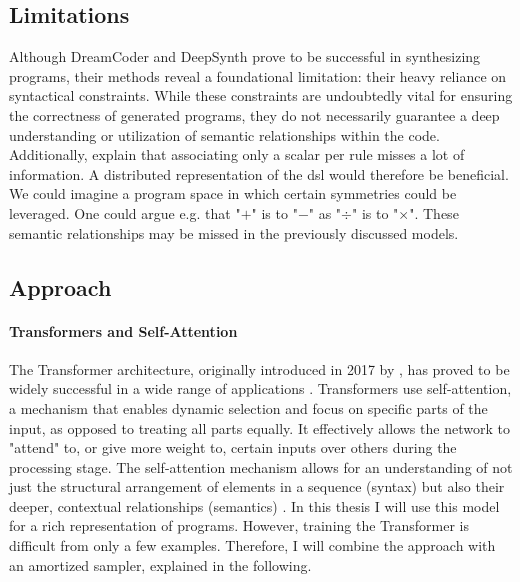 \subsection{Limitations}
Although DreamCoder and DeepSynth prove to be successful in synthesizing programs, their methods reveal a foundational limitation: their heavy reliance on syntactical constraints.
While these constraints are undoubtedly vital for ensuring the correctness of generated programs, they do not necessarily guarantee a deep understanding or utilization of semantic relationships within the code. Additionally, \citet{kimCompoundProbabilisticContextFree2019} explain that associating only a scalar per rule misses a lot of information. A distributed representation of the \acrshort{dsl} would therefore be beneficial. We could imagine a program space in which certain symmetries could be leveraged. One could argue e.g. that "\(+\)" is to "\(-\)" as "\(\div\)" is to "\(\times\)". These semantic relationships may be missed in the previously discussed models.

\subsection{Approach}
\paragraph*{Transformers and Self-Attention}
The Transformer architecture, originally introduced in 2017 by \citet{vaswaniAttentionAllYou2017}, has proved to be widely successful in a wide range of applications \cite{wolfTransformersStateoftheArtNatural2020,khanTransformersVisionSurvey2022}. Transformers use self-attention, a mechanism that enables dynamic selection and focus on specific parts of the input, as opposed to treating all parts equally. It effectively allows the network to "attend" to, or give more weight to, certain inputs over others during the processing stage. The self-attention mechanism allows for an understanding of not just the structural arrangement of elements in a sequence (syntax) but also their deeper, contextual relationships (semantics) \cite{wolfram2023chatgpt}. In this thesis I will use this model for a rich representation of programs. However, training the Transformer is difficult from only a few examples. Therefore, I will combine the approach with an amortized sampler, explained in the following.

